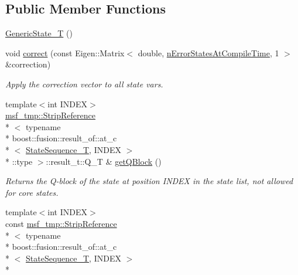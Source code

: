 \subsection*{Public Member Functions}
\begin{DoxyCompactItemize}
\item 
\hyperlink{structmsf__core_1_1GenericState__T_a88750885741e083ad8a758064777b595}{Generic\-State\-\_\-\-T} ()
\item 
void \hyperlink{structmsf__core_1_1GenericState__T_acc97b8f5fe79d78dd1528b7c57100c5d}{correct} (const Eigen\-::\-Matrix$<$ double, \hyperlink{structmsf__core_1_1GenericState__T_a20545d9aacd8f84bc1a97a873310cd5fab0136c5805e4e8d75677885fcaad5901}{n\-Error\-States\-At\-Compile\-Time}, 1 $>$ \&correction)
\begin{DoxyCompactList}\small\item\em Apply the correction vector to all state vars. \end{DoxyCompactList}\item 
{\footnotesize template$<$int I\-N\-D\-E\-X$>$ }\\\hyperlink{structmsf__tmp_1_1StripReference}{msf\-\_\-tmp\-::\-Strip\-Reference}\\*
$<$ typename \\*
boost\-::fusion\-::result\-\_\-of\-::at\-\_\-c\\*
$<$ \hyperlink{structmsf__core_1_1GenericState__T_a75fe70f7c7517dbf7d4c91b75b08a1dd}{State\-Sequence\-\_\-\-T}, I\-N\-D\-E\-X $>$\\*
\-::type $>$\-::result\-\_\-t\-::\-Q\-\_\-\-T \& \hyperlink{structmsf__core_1_1GenericState__T_a34e6c50f303098c763a02fbe8c3b673e}{get\-Q\-Block} ()
\begin{DoxyCompactList}\small\item\em Returns the Q-\/block of the state at position I\-N\-D\-E\-X in the state list, not allowed for core states. \end{DoxyCompactList}\item 
{\footnotesize template$<$int I\-N\-D\-E\-X$>$ }\\const \hyperlink{structmsf__tmp_1_1StripReference}{msf\-\_\-tmp\-::\-Strip\-Reference}\\*
$<$ typename \\*
boost\-::fusion\-::result\-\_\-of\-::at\-\_\-c\\*
$<$ \hyperlink{structmsf__core_1_1GenericState__T_a75fe70f7c7517dbf7d4c91b75b08a1dd}{State\-Sequence\-\_\-\-T}, I\-N\-D\-E\-X $>$\\*

\end{DoxyCompactItemize}
